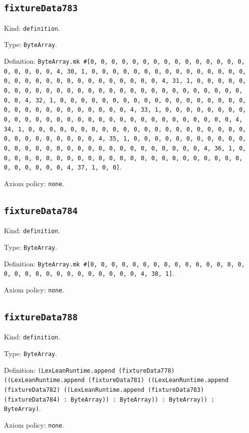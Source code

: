 \documentclass[11pt]{article}
\begin{document}
\subsection*{\texttt{fixtureData783}}
\noindent Kind: \texttt{definition}.\par
\noindent Type: \texttt{ByteArray}.\par
\noindent Definition: \texttt{ByteArray.mk \#[0, 0, 0, 0, 0, 0, 0, 0, 0, 0, 0, 0, 0, 0, 0, 0, 0, 0, 0, 0, 4, 30, 1, 0, 0, 0, 0, 0, 0, 0, 0, 0, 0, 0, 0, 0, 0, 0, 0, 0, 0, 0, 0, 0, 0, 0, 0, 0, 0, 0, 0, 0, 0, 4, 31, 1, 0, 0, 0, 0, 0, 0, 0, 0, 0, 0, 0, 0, 0, 0, 0, 0, 0, 0, 0, 0, 0, 0, 0, 0, 0, 0, 0, 0, 0, 0, 4, 32, 1, 0, 0, 0, 0, 0, 0, 0, 0, 0, 0, 0, 0, 0, 0, 0, 0, 0, 0, 0, 0, 0, 0, 0, 0, 0, 0, 0, 0, 0, 0, 4, 33, 1, 0, 0, 0, 0, 0, 0, 0, 0, 0, 0, 0, 0, 0, 0, 0, 0, 0, 0, 0, 0, 0, 0, 0, 0, 0, 0, 0, 0, 0, 0, 4, 34, 1, 0, 0, 0, 0, 0, 0, 0, 0, 0, 0, 0, 0, 0, 0, 0, 0, 0, 0, 0, 0, 0, 0, 0, 0, 0, 0, 0, 0, 0, 0, 4, 35, 1, 0, 0, 0, 0, 0, 0, 0, 0, 0, 0, 0, 0, 0, 0, 0, 0, 0, 0, 0, 0, 0, 0, 0, 0, 0, 0, 0, 0, 0, 0, 4, 36, 1, 0, 0, 0, 0, 0, 0, 0, 0, 0, 0, 0, 0, 0, 0, 0, 0, 0, 0, 0, 0, 0, 0, 0, 0, 0, 0, 0, 0, 0, 0, 4, 37, 1, 0, 0]}.\par
\noindent Axiom policy: \texttt{none}.\par
\subsection*{\texttt{fixtureData784}}
\noindent Kind: \texttt{definition}.\par
\noindent Type: \texttt{ByteArray}.\par
\noindent Definition: \texttt{ByteArray.mk \#[0, 0, 0, 0, 0, 0, 0, 0, 0, 0, 0, 0, 0, 0, 0, 0, 0, 0, 0, 0, 0, 0, 0, 0, 0, 0, 0, 0, 4, 38, 1]}.\par
\noindent Axiom policy: \texttt{none}.\par
\subsection*{\texttt{fixtureData788}}
\noindent Kind: \texttt{definition}.\par
\noindent Type: \texttt{ByteArray}.\par
\noindent Definition: \texttt{(LexLeanRuntime.append (fixtureData778) ((LexLeanRuntime.append (fixtureData781) ((LexLeanRuntime.append (fixtureData782) ((LexLeanRuntime.append (fixtureData783) (fixtureData784) : ByteArray)) : ByteArray)) : ByteArray)) : ByteArray)}.\par
\noindent Axiom policy: \texttt{none}.\par
\end{document}
